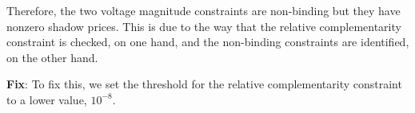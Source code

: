 \documentclass[11pt]{article}
\begin{document}
Therefore, the two voltage magnitude constraints are non-binding but they have nonzero shadow prices.
This is due to the way that the relative complementarity constraint is checked, on one hand, and the non-binding constraints are identified, on the other hand.

\textbf{Fix}:
To fix this, we set the threshold for the relative complementarity constraint to a lower value, $10^{-8}$.
\end{document}
